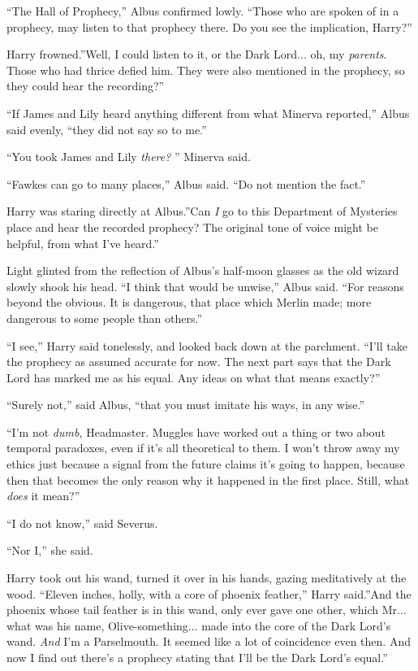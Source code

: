 ``The Hall of Prophecy,'' Albus confirmed lowly. ``Those who are spoken
of in a prophecy, may listen to that prophecy there. Do you see the
implication, Harry?''

Harry frowned.''Well, I could listen to it, or the Dark Lord... oh,
my \emph{parents}. Those who had thrice defied him. They were also
mentioned in the prophecy, so they could hear the recording?''

``If James and Lily heard anything different from what Minerva
reported,'' Albus said evenly, ``they did not say so to me.''

``You took James and Lily \emph{there?} '' Minerva said.

``Fawkes can go to many places,'' Albus said. ``Do not mention the
fact.''

Harry was staring directly at Albus.''Can \emph{I} go to this Department
of Mysteries place and hear the recorded prophecy? The original tone of
voice might be helpful, from what I've heard.''

Light glinted from the reflection of Albus's half-moon glasses as the
old wizard slowly shook his head. ``I think that would be unwise,''
Albus said. ``For reasons beyond the obvious. It is dangerous, that
place which Merlin made; more dangerous to some people than others.''

``I see,'' Harry said tonelessly, and looked back down at the parchment.
``I'll take the prophecy as assumed accurate for now. The next part says
that the Dark Lord has marked me as his equal. Any ideas on what that
means exactly?''

``Surely not,'' said Albus, ``that you must imitate his ways, in any
wise.''

``I'm not \emph{dumb,} Headmaster. Muggles have worked out a thing or two
about temporal paradoxes, even if it's all theoretical to them. I won't
throw away my ethics just because a signal from the future claims it's
going to happen, because then that becomes the only reason why it
happened in the first place. Still, what \emph{does} it mean?''

``I do not know,'' said Severus.

``Nor I,'' she said.

Harry took out his wand, turned it over in his hands, gazing
meditatively at the wood. ``Eleven inches, holly, with a core of phoenix
feather,'' Harry said.''And the phoenix whose tail feather is in this
wand, only ever gave one other, which Mr... what was his name,
Olive-something... made into the core of the Dark Lord's wand.
\emph{And} I'm a Parselmouth. It seemed like a lot of coincidence even
then. And now I find out there's a prophecy stating that I'll be the
Dark Lord's equal.''

